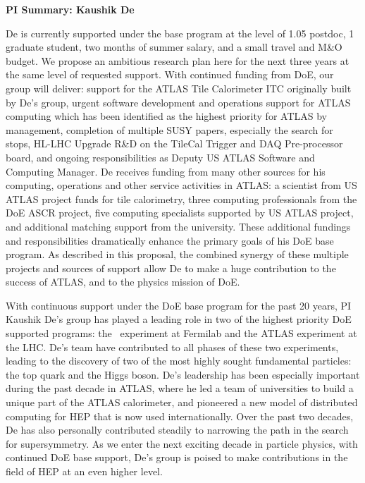
\begin{center}
\Large\textbf{PI Summary: Kaushik De}
\end{center}


De is currently supported under the base program at the level of 1.05 postdoc, 1 graduate student, two months of summer salary, and a small travel and M\&O budget. We propose an ambitious research plan here for the next three years at the same level of requested support. With continued funding from DoE, our group will deliver: support for the ATLAS Tile Calorimeter ITC originally built by De's group, urgent software development and operations support for ATLAS computing which has been identified as the highest priority for ATLAS by management, completion of multiple SUSY papers, especially the search for stops, HL-LHC Upgrade R\&D on the TileCal Trigger and DAQ Pre-processor board, and ongoing responsibilities as Deputy US ATLAS Software and Computing Manager. De receives funding from many other sources for his computing, operations and other service activities in ATLAS: a scientist from US ATLAS project funds for tile calorimetry, three computing professionals from the DoE ASCR project, five computing specialists supported by US ATLAS project, and additional matching support from the university. These additional fundings and responsibilities dramatically enhance the primary goals of his DoE base program. As described in this proposal, the combined synergy of these multiple projects and sources of support allow De to make a huge contribution to the success of ATLAS, and to the physics mission of DoE.

With continuous support under the DoE base program for the past 20 years, PI Kaushik De's group has played a leading role in two of the highest priority DoE supported programs: the \ experiment at Fermilab and the ATLAS experiment at the LHC. De's team have contributed to all phases of these two experiments, leading to the discovery of two of the most highly sought fundamental particles: the top quark and the Higgs boson. De's leadership has been especially important during the past decade in ATLAS, where he led a team of universities to build a unique part of the ATLAS calorimeter, and pioneered a new model of distributed computing for HEP that is now used internationally. Over the past two decades, De has also personally contributed steadily to narrowing the path in the search for supersymmetry. As we enter the next exciting decade in particle physics, with continued DoE base support, De's group is poised to make contributions in the field of HEP at an even higher level.

